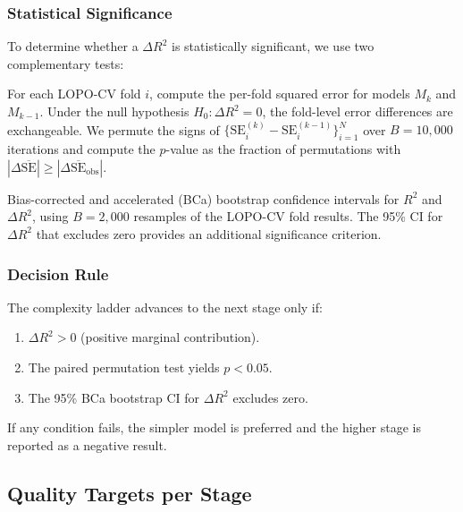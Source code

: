 \subsubsection{Statistical Significance}

To determine whether a $\Delta R^2$ is statistically significant, we use
two complementary tests:

\begin{description}[leftmargin=*,labelwidth=!]
  \item[Paired permutation test.] For each LOPO-CV fold $i$, compute
    the per-fold squared error for models $M_k$ and $M_{k-1}$. Under the
    null hypothesis $H_0: \Delta R^2 = 0$, the fold-level error differences
    are exchangeable. We permute the signs of $\{\text{SE}_i^{(k)} -
    \text{SE}_i^{(k-1)}\}_{i=1}^N$ over $B = 10{,}000$ iterations and
    compute the $p$-value as the fraction of permutations with
    $|\Delta \overline{\text{SE}}| \geq |\Delta \overline{\text{SE}}_{\text{obs}}|$.

  \item[BCa bootstrap CIs.] Bias-corrected and accelerated (BCa) bootstrap
    confidence intervals \cite{efron1987bca} for $R^2$ and $\Delta R^2$,
    using $B = 2{,}000$ resamples of the LOPO-CV fold results. The 95\%
    CI for $\Delta R^2$ that excludes zero provides an additional
    significance criterion.
\end{description}

\subsubsection{Decision Rule}

The complexity ladder advances to the next stage only if:
\begin{enumerate}[leftmargin=*]
  \item $\Delta R^2 > 0$ (positive marginal contribution).
  \item The paired permutation test yields $p < 0.05$.
  \item The 95\% BCa bootstrap CI for $\Delta R^2$ excludes zero.
\end{enumerate}
If any condition fails, the simpler model is preferred and the higher stage
is reported as a negative result.

\subsection{Quality Targets per Stage}
\label{sec:eval:quality}

